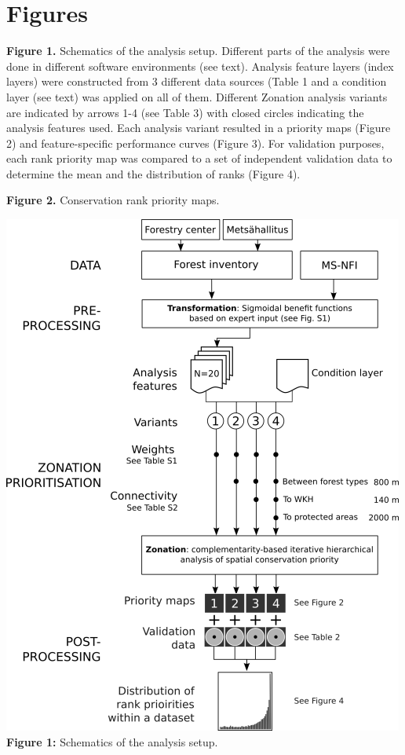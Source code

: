 \section{Figures}

\textbf{Figure 1.} Schematics of the analysis setup. Different parts of
the analysis were done in different software environments (see text).
Analysis feature layers (index layers) were constructed from 3 different
data sources (Table 1 and a condition layer (see text) was applied on
all of them. Different Zonation analysis variants are indicated by
arrows 1-4 (see Table 3) with closed circles indicating the analysis
features used. Each analysis variant resulted in a priority maps (Figure
2) and feature-specific performance curves (Figure 3). For validation
purposes, each rank priority map was compared to a set of independent
validation data to determine the mean and the distribution of ranks
(Figure 4).

\textbf{Figure 2.} Conservation rank priority maps.

\includegraphics{figs/Fig1_w500.png}\\\textbf{Figure 1:} Schematics of
the analysis setup.

